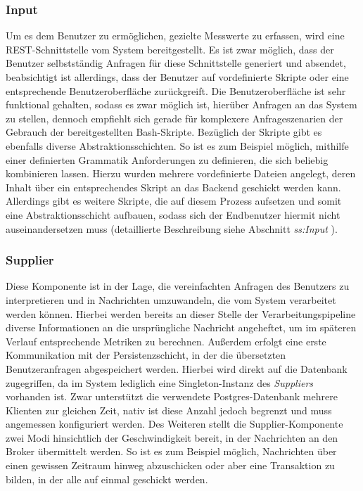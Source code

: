 \subsubsection{Input}
Um es dem Benutzer zu ermöglichen, gezielte Messwerte zu erfassen, wird eine REST-Schnittstelle vom System bereitgestellt. Es ist zwar möglich, dass der Benutzer selbstständig Anfragen für diese Schnittstelle generiert und absendet, beabsichtigt ist allerdings, dass der Benutzer auf vordefinierte Skripte oder eine entsprechende Benutzeroberfläche zurückgreift. Die Benutzeroberfläche ist sehr funktional gehalten, sodass es zwar möglich ist, hierüber Anfragen an das System zu stellen, dennoch empfiehlt sich gerade für komplexere Anfrageszenarien der Gebrauch der bereitgestellten Bash-Skripte. Bezüglich der Skripte gibt es ebenfalls diverse Abstraktionsschichten. So ist es zum Beispiel möglich, mithilfe einer definierten Grammatik Anforderungen zu definieren, die sich beliebig kombinieren lassen. Hierzu wurden mehrere vordefinierte Dateien angelegt, deren Inhalt über ein entsprechendes Skript an das Backend geschickt werden kann. Allerdings gibt es weitere Skripte, die auf diesem Prozess aufsetzen und somit eine Abstraktionsschicht aufbauen, sodass sich der Endbenutzer hiermit nicht auseinandersetzen muss (detaillierte Beschreibung siehe Abschnitt \emph{ss:Input} ).

\subsubsection{Supplier}
Diese Komponente ist in der Lage, die vereinfachten Anfragen des Benutzers zu interpretieren und in Nachrichten umzuwandeln, die vom System verarbeitet werden können. Hierbei werden bereits an dieser Stelle der Verarbeitungspipeline diverse Informationen an die ursprüngliche Nachricht angeheftet, um im späteren Verlauf entsprechende Metriken zu berechnen. Außerdem erfolgt eine erste Kommunikation mit der Persistenzschicht, in der die übersetzten Benutzeranfragen abgespeichert werden. Hierbei wird direkt auf die Datenbank zugegriffen, da im System lediglich eine Singleton-Instanz des \emph{Suppliers} vorhanden ist. Zwar unterstützt die verwendete Postgres-Datenbank mehrere Klienten zur gleichen Zeit, nativ ist diese Anzahl jedoch begrenzt und muss angemessen konfiguriert werden. Des Weiteren stellt die Supplier-Komponente zwei Modi hinsichtlich der Geschwindigkeit bereit, in der Nachrichten an den Broker übermittelt werden. So ist es zum Beispiel möglich, Nachrichten über einen gewissen Zeitraum hinweg abzuschicken oder aber eine Transaktion zu bilden, in der alle auf einmal geschickt werden.

